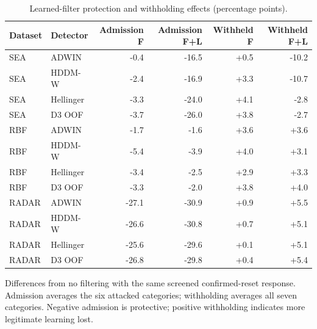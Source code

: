\begin{table}[htbp]
\centering\small\singlespacing
\caption{Learned-filter protection and withholding effects (percentage points).}\label{tab:filter_protection}
\setlength{\tabcolsep}{4pt}
\renewcommand{\arraystretch}{1.18}
\begin{tabular}{@{}llrrrr@{}}
\toprule
Dataset & Detector & Admission F & Admission F+L & Withheld F & Withheld F+L \\
\midrule
SEA & ADWIN & -0.4 & -16.5 & +0.5 & -10.2 \\
SEA & HDDM-W & -2.4 & -16.9 & +3.3 & -10.7 \\
SEA & Hellinger & -3.3 & -24.0 & +4.1 & -2.8 \\
SEA & D3 OOF & -3.7 & -26.0 & +3.8 & -2.7 \\
RBF & ADWIN & -1.7 & -1.6 & +3.6 & +3.6 \\
RBF & HDDM-W & -5.4 & -3.9 & +4.0 & +3.1 \\
RBF & Hellinger & -3.4 & -2.5 & +2.9 & +3.3 \\
RBF & D3 OOF & -3.3 & -2.0 & +3.8 & +4.0 \\
RADAR & ADWIN & -27.1 & -30.9 & +0.9 & +5.5 \\
RADAR & HDDM-W & -26.6 & -30.8 & +0.7 & +5.1 \\
RADAR & Hellinger & -25.6 & -29.6 & +0.1 & +5.1 \\
RADAR & D3 OOF & -26.8 & -29.8 & +0.4 & +5.4 \\
\bottomrule
\end{tabular}
\par\smallskip\begin{minipage}{\textwidth}\footnotesize Differences from no filtering with the same screened confirmed-reset response. Admission averages the six attacked categories; withholding averages all seven categories. Negative admission is protective; positive withholding indicates more legitimate learning lost.\end{minipage}
\end{table}
